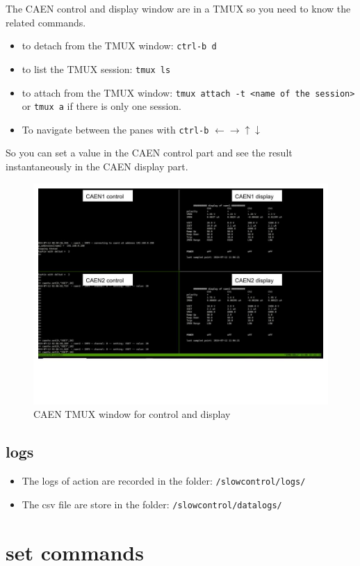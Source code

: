 \documentclass{article}
\begin{document}
The CAEN control and display window are in a TMUX so you need to know the related commands.
\begin{itemize}
    \item to detach from the TMUX window: \verb|ctrl-b d| 
    \item to list the TMUX session: \verb|tmux ls|
    \item to attach from the TMUX window: \verb|tmux attach -t <name of the session>| or \verb|tmux a| if there is only one session.  
    \item To navigate between the panes with \verb|ctrl-b| $\leftarrow \rightarrow \uparrow \downarrow$
\end{itemize}
So you can set a value in the CAEN control part and see the result instantaneously in the CAEN display part. 

\begin{figure}
\centering
\includegraphics[width=0.9\linewidth]{caen_all.jpg}
\caption{\label{fig:caen_all}CAEN TMUX window for control and display}
\end{figure}
\subsection{logs}
\begin{itemize}
    \item The logs of action are recorded in the folder: \verb|/slowcontrol/logs/|
    \item The csv file are store in the folder: \verb|/slowcontrol/datalogs/| 
\end{itemize}

\appendix
\section{set commands}
\end{document}
